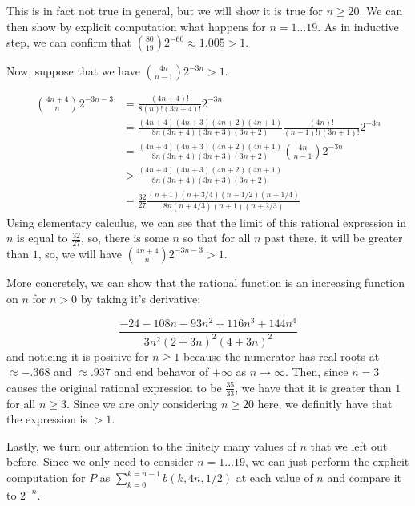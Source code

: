 \documentclass{article}
\begin{document}
This is in fact not true in general, but we will show it is true for $n\ge 20$. We can then show by explicit computation what happens for $n=1\ldots 19$. As in inductive step, we can confirm that $\binom{80}{19} 2^{-60} \approx 1.005 > 1$.

Now, suppose that we have $\binom{4n}{n-1} 2^{-3n} >1$.

\begin{align*}
\binom{4n+4}{n} 2^{-3n-3} &= \frac{(4n+4)!}{8(n)!(3n+4)!} 2^{-3n}\\
&=\frac{(4n+4)(4n+3)(4n+2)(4n+1)}{8n(3n+4)(3n+3)(3n+2)}\frac{(4n)!}{(n-1)!((3n+1)!}2^{-3n}\\
&=\frac{(4n+4)(4n+3)(4n+2)(4n+1)}{8n(3n+4)(3n+3)(3n+2)} \binom{4n}{n-1} 2^{-3n}\\
&> \frac{(4n+4)(4n+3)(4n+2)(4n+1)}{8n(3n+4)(3n+3)(3n+2)}\\
&= \frac{32}{27} \frac{(n+1)(n+3/4)(n+1/2)(n+1/4)}{8n(n+4/3)(n+1)(n+2/3)}
\end{align*}
Using elementary calculus, we can see that the limit of this rational expression in $n$ is equal to $\frac{32}{27}$, so, there is some $n$ so that for all $n$ past there, it will be greater than $1$, so, we will have $ \binom{4n+4}{n} 2^{-3n-3}>1$. 

More concretely, we can show that the rational function is an increasing function on $n$ for $n>0$ by taking it's derivative:

\[
\frac{-24 - 108 n - 93 n^2 + 116 n^3 + 144 n^4}{3 n^2 (2 + 3 n)^2 (4 + 3 n)^2}
\]
 and noticing it is positive for $n\ge 1$ because the numerator has real roots at $\approx -.368$ and $\approx .937$ and end behavor of $+\infty$ as $n\rightarrow \infty$. Then, since $n=3$ causes the original rational expression to be $\frac{35}{33}$, we have that it is greater than $1$ for all $n\ge 3$. Since we are only considering $n\ge 20$ here, we definitly have that the expression is $>1$.

Lastly, we turn our attention to the finitely many values of $n$ that we left out before. Since we only need to consider $n=1\ldots 19$, we can just perform the explicit computation for $P$ as $ \sum_{k=0}^{k=n-1} b(k,4n,1/2)$ at each value of $n$ and compare it to $2^{-n}$.
\end{document}
